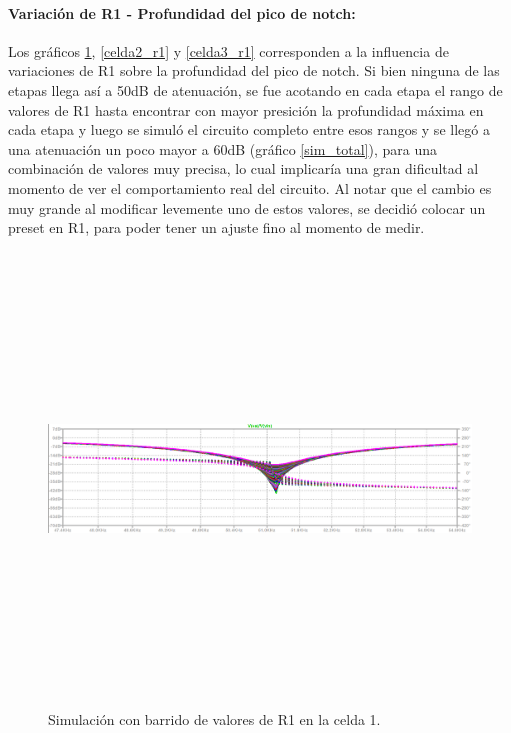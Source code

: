 \paragraph{Variaci\'on de R1 - Profundidad del pico de notch:} Los gr\'aficos \ref{celda1_r1}, \ref{celda2_r1} y \ref{celda3_r1} corresponden a la influencia de variaciones de R1 sobre la profundidad del pico de notch. Si bien ninguna de las etapas llega as\'i a 50dB de atenuaci\'on, se fue acotando en cada etapa el rango de valores de R1 hasta encontrar con mayor presici\'on la profundidad m\'axima en cada etapa y luego se simul\'o el circuito completo entre esos rangos y se lleg\'o a una atenuaci\'on un poco mayor a 60dB (gr\'afico \ref{sim_total}), para una combinaci\'on de valores muy precisa, lo cual implicar\'ia una gran dificultad al momento de ver el comportamiento real del circuito. Al notar que el cambio es muy grande al modificar levemente uno de estos valores, se decidi\'o colocar un preset en R1, para poder tener un ajuste fino al momento de medir. 

\begin{figure}[H] %
	\centering	\includegraphics[width=12cm,height=12cm,keepaspectratio]{../EJ4/graficos/etapa1_R1.png}
	\caption{Simulaci\'on con barrido de valores de R1 en la celda 1.}
	\label{celda1_r1}
\end{figure}

